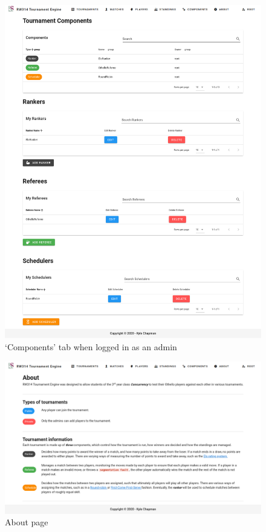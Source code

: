\documentclass[a4paper, 11pt]{report}
\begin{document}
\begin{figure}[H]
	\centering
	\includegraphics[scale=0.35]{components-admin.png}
	\caption{`Components' tab when logged in as an admin}
	\label{fig:components-admin}
\end{figure}
\begin{figure}[H]
	\centering
	\includegraphics[scale=0.37]{about-admin.png}
	\caption{About page}
	\label{fig:about-admin}
\end{figure}
\end{document}
